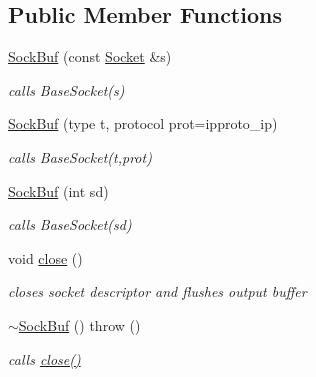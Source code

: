 \subsection*{Public Member Functions}
\begin{CompactItemize}
\item 
\hypertarget{classsocketpp_1_1SockBuf_065ef76cdf18c04857350c643bd620e3}{
\hyperlink{classsocketpp_1_1SockBuf_065ef76cdf18c04857350c643bd620e3}{SockBuf} (const \hyperlink{classsocketpp_1_1Socket}{Socket} \&s)}
\label{classsocketpp_1_1SockBuf_065ef76cdf18c04857350c643bd620e3}

\begin{CompactList}\small\item\em calls BaseSocket(s) \item\end{CompactList}\item 
\hypertarget{classsocketpp_1_1SockBuf_5e8a5860fd67228e5d39ea28f9d67341}{
\hyperlink{classsocketpp_1_1SockBuf_5e8a5860fd67228e5d39ea28f9d67341}{SockBuf} (type t, protocol prot=ipproto\_\-ip)}
\label{classsocketpp_1_1SockBuf_5e8a5860fd67228e5d39ea28f9d67341}

\begin{CompactList}\small\item\em calls BaseSocket(t,prot) \item\end{CompactList}\item 
\hypertarget{classsocketpp_1_1SockBuf_71bbd8cf2bd9dd79b8067b0ef771bf23}{
\hyperlink{classsocketpp_1_1SockBuf_71bbd8cf2bd9dd79b8067b0ef771bf23}{SockBuf} (int sd)}
\label{classsocketpp_1_1SockBuf_71bbd8cf2bd9dd79b8067b0ef771bf23}

\begin{CompactList}\small\item\em calls BaseSocket(sd) \item\end{CompactList}\item 
\hypertarget{classsocketpp_1_1SockBuf_28f88c6ac0570ee5e9d57e255733b0f9}{
void \hyperlink{classsocketpp_1_1SockBuf_28f88c6ac0570ee5e9d57e255733b0f9}{close} ()}
\label{classsocketpp_1_1SockBuf_28f88c6ac0570ee5e9d57e255733b0f9}

\begin{CompactList}\small\item\em closes socket descriptor and flushes output buffer \item\end{CompactList}\item 
\hypertarget{classsocketpp_1_1SockBuf_ee857faaed622effa453c7b53749ff14}{
\hyperlink{classsocketpp_1_1SockBuf_ee857faaed622effa453c7b53749ff14}{$\sim$SockBuf} ()  throw ()}
\label{classsocketpp_1_1SockBuf_ee857faaed622effa453c7b53749ff14}

\begin{CompactList}\small\item\em calls \hyperlink{classsocketpp_1_1SockBuf_28f88c6ac0570ee5e9d57e255733b0f9}{close()} \item\end{CompactList}\end{CompactItemize}
